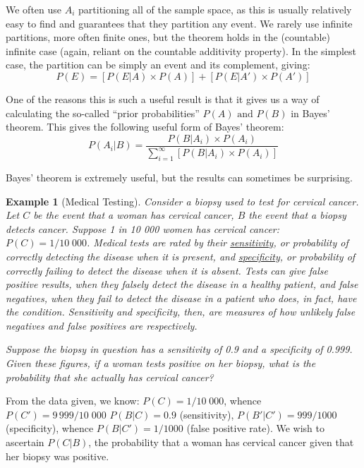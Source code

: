 \documentclass[12pt,a4paper]{article}
\newtheorem{ex}[thm]{Example}
\begin{document}
We often use $A_i$ partitioning all of the sample space, as this is usually relatively easy to find and guarantees that they partition any event. We rarely use infinite partitions, more often finite ones, but the theorem holds in the (countable) infinite case (again, reliant on the countable additivity property). In the simplest case, the partition can be simply an event and its complement, giving:
$$P(E) =[ P(E|A) \times P(A)] + [P(E|A') \times P(A')]$$

One of the reasons this is such a useful result is that it gives us a way of calculating the so-called ``prior probabilities'' $P(A) \text{ and } P(B)$ in Bayes' theorem. This gives the following useful form of Bayes' theorem:
$$P(A_i|B) = \frac{P(B|A_i) \times P(A_i)}{\sum\limits_{i=1}^{\infty}[P(B|A_i) \times P(A_i)]}$$\par
\vspace{12pt}

\noindent Bayes' theorem is extremely useful, but the results can sometimes be surprising.

\begin{ex}[Medical Testing]

Consider a biopsy used to test for cervical cancer. Let $C$ be the event that a woman has cervical cancer, $B$ the event that a biopsy detects cancer. Suppose 1 in 10 000 women has cervical cancer: $P(C) = 1/10\;000$. Medical tests are rated by their \underline{sensitivity}, or probability of correctly detecting the disease when it is present, and \underline{specificity}, or probability of correctly failing to detect the disease when it is absent. Tests can give false positive results, when they falsely detect the disease in a healthy patient, and false negatives, when they fail to detect the disease in a patient who does, in fact, have the condition. Sensitivity and specificity, then, are measures of how unlikely false negatives and false positives are respectively.

\indent Suppose the biopsy in question has a sensitivity of 0.9 and a specificity of 0.999. Given these figures, if a woman tests positive on her biopsy, what is the probability that she actually has cervical cancer?
\end{ex}

From the data given, we know: $P(C) = 1/10\;000$, whence $P(C') = 9\,999/10\;000$ $P(B|C) = 0.9$ (sensitivity),  $P(B'|C') = 999/1000$ (specificity), whence $P(B|C') = 1/1000$ (false positive rate). We wish to ascertain $P(C|B)$, the probability that a woman has cervical cancer given that her biopsy was positive.\par
\vspace{12pt}
\end{document}
